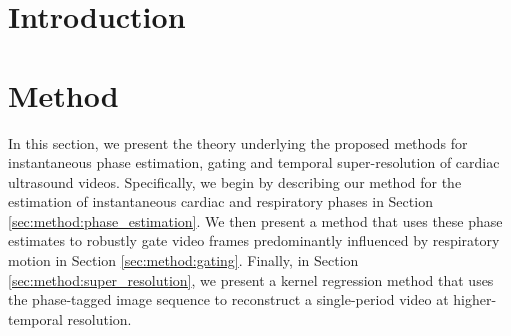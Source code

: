 \documentclass[runningheads,a4paper]{llncs}
\begin{document}
\vspace{-0.5cm}
\section{Introduction}
\label{sec:intro}
%

%

\section{Method}
\label{sec:method}
%
In this section, we present the theory underlying the proposed methods for instantaneous phase estimation, gating and temporal super-resolution of cardiac ultrasound videos. Specifically, we begin by describing our method for the estimation of instantaneous cardiac and respiratory phases in 
Section \ref{sec:method:phase_estimation}. We then present a method that uses these phase estimates to robustly gate video frames predominantly influenced by respiratory motion in Section \ref{sec:method:gating}. Finally, in Section \ref{sec:method:super_resolution}, we present a kernel regression method that uses the phase-tagged image sequence to reconstruct a single-period video at higher-temporal resolution. 
%
%
\end{document}
